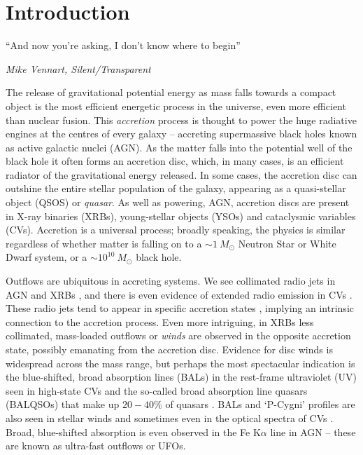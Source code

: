 \chapter{Introduction}

\epigraph{``And now you're asking, I don't know where to begin''}{{\sl Mike Vennart, Silent/Transparent}}
%

The release of gravitational potential energy as mass falls towards
a compact object is the most efficient energetic process in the universe,
even more efficient than nuclear fusion.
This {\em accretion} process is thought to power the huge radiative engines at the 
centres of every galaxy -- accreting supermassive black holes 
known as active galactic nuclei (AGN).
As the matter falls into the potential well of the 
black hole it often forms an accretion disc,
which, in many cases, is an efficient radiator of the gravitational energy released.
In some cases, the accretion disc can outshine the entire stellar population of the galaxy,
appearing as a quasi-stellar object (QSOS) or {\em quasar}. 
As well as powering, AGN, 
accretion discs are present in X-ray binaries (XRBs), young-stellar objects (YSOs) and
cataclysmic variables (CVs). Accretion is a universal process; 
broadly speaking, the physics is similar regardless of 
whether matter is falling on to a $\sim1~M_\odot$ Neutron Star or White Dwarf 
system, or a $\sim10^{10}~M_\odot$ black hole. 

Outflows are ubiquitous in accreting systems. We see collimated radio jets in AGN 
\citep{hazard1963,potash1980,perley1984,marscher2006} and XRBs \citep{bellonijet2010}, 
and there is even evidence of extended radio emission in 
CVs \citep{benz1983,coppejans2015}. 
These radio jets tend to appear in specific 
accretion states \citep{fender2001,fender2004,kordingDNjet2008}, 
implying an intrinsic connection to the 
accretion process. Even more intriguing, in XRBs less collimated, mass-loaded outflows
or {\em winds} are observed in the opposite accretion state, possibly emanating from the accretion disc.
Evidence for disc winds is widespread across the mass range, but perhaps the most spectacular indication
is the blue-shifted, broad absorption lines (BALs) in the rest-frame ultraviolet (UV)
seen in high-state CVs \citep{heap1978,greensteinoke1982,cordova1982}
and the so-called broad absorption line quasars (BALQSOs) that make up $20-40\%$
of quasars \citep{weymann1991,knigge2008,allen2011}. 
BALs and `P-Cygni' profiles \citep{struve1935,rottenburg1952}
are also seen in stellar winds \citep[e.g.][]{cassinelli1979} and sometimes even
in the optical spectra of CVs \citep{patterson1996, RN98, kafka2004}. 
Broad, blue-shifted absorption is even observed in the Fe K$\alpha$ line in 
AGN \citep{reeves2003,poundsreeves2009,tombesi2010a} -- these are known
as ultra-fast outflows or UFOs.

